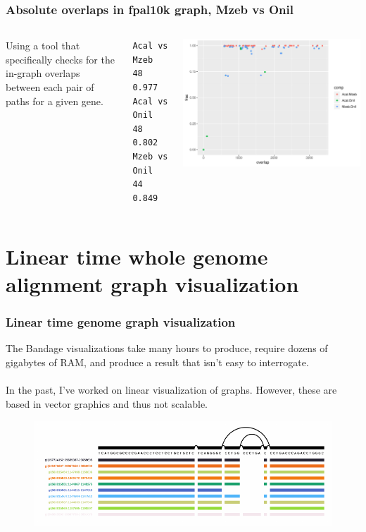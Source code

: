 \documentclass[aspectratio=169]{beamer}
\begin{document}
\begin{frame}[fragile]
  \frametitle{Absolute overlaps in fpal10k graph, Mzeb vs Onil}
    \begin{columns}[c] %
    Using a tool that specifically checks for the in-graph overlaps between each pair of paths for a given gene.
\begin{verbatim}
Acal vs Mzeb     48     0.977
Acal vs Onil     48     0.802
Mzeb vs Onil     44     0.849
\end{verbatim}
    \includegraphics[scale=0.42,center]{busco-path-overlaps.pdf}
\end{columns}

\end{frame}

\section{Linear time whole genome alignment graph visualization}
\begin{frame}[fragile]
  \frametitle{Linear time genome graph visualization}
  The Bandage visualizations take many hours to produce, require dozens of gigabytes of RAM, and produce a result that isn't easy to interrogate.
  \\~\\
  In the past, I've worked on linear visualization of graphs.
  However, these are based in vector graphics and thus not scalable.
  \begin{figure}
    \includegraphics[scale=1,center]{vg_viz_H-3136_crop.pdf}
  \end{figure}
\end{frame}
\end{document}
